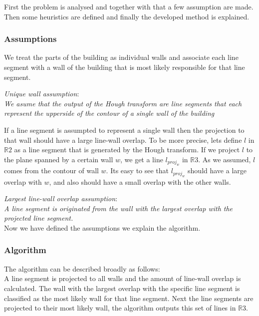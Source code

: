 \documentclass[10pt]{article}
\begin{document}
	First the problem is analysed and together with that a few assumption are made.
	Then some heuristics are defined and finally the developed method is explained.

	\subsubsection{Assumptions}
	We treat the parts of the building as individual walls and associate each
	line segment with a wall of the building that is most likely responsible for
	that line segment. 

	\emph{Unique wall assumption}:\\
	\emph{We asume that the output of the Hough transform are line segments that
	each represent the upperside of the contour of a single wall of the building}



	If a line segment is assumpted to represent a single wall then the
	projection to that wall should have a large line-wall overlap. To be more
	precise, lets define $l$ in $\mathbb{R}2$ as a line segment that is generated by the Hough
	transform.  If we project $l$ to the plane spanned by a certain wall $w$, we
	get a line $l_{proj_w}$ in $\mathbb{R}3$.  As we assumed, $l$ comes from the 
	contour of wall $w$. Its easy to see that $l_{proj_w}$
	should have a large overlap with $w$, and also should have a small overlap with
	the other walls.
	
	\emph{Largest line-wall overlap assumption}:\\
	\emph{A line segment is originated from the wall with the largest overlap
	with the projected line segment.}\\

	Now we have defined the assumptions we explain the algorithm.

	\subsubsection{Algorithm}
	The algorithm can be described broadly as follows:\\
	A line segment is projected to all walls and the amount of line-wall overlap is
	calculated. The wall with the largest overlap with the specific line
segment is classified as the most likely wall for that line segment.
	Next the line segments are projected to their most likely wall, the
	algorithm outputs this set of lines in $\mathbb{R}3$. 
	
\end{document}
